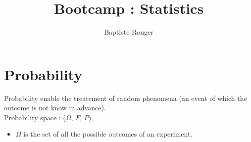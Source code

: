 \documentclass[10pt,a4paper]{article}
\author{Baptiste Rouger}
\title{Bootcamp : Statistics}
\begin{document}
\maketitle

\begin{flushright}
\end{flushright}

\tableofcontents

\newpage

\part{Probability}

Probability enable the treatement of random phenomena (an event of which the outcome is not know in advance).\\
Probability space : ($\Omega$, $F$, $P$)\\
\begin{itemize}
  \item $\Omega$ is the set of all the possible outcomes of an experiment.
\end{itemize}
\end{document}
